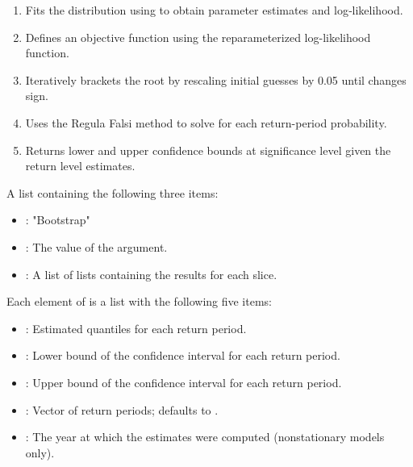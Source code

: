 \documentclass[a4paper]{book}
\begin{document}
%
\begin{Details}
\begin{enumerate}

\item{} Fits the distribution using  to obtain parameter
estimates and log‐likelihood.
\item{} Defines an objective function  using the reparameterized
log-likelihood function.
\item{} Iteratively brackets the root by rescaling initial guesses by 0.05 until
 changes sign.
\item{} Uses the Regula Falsi method to solve  for each
return-period probability.
\item{} Returns lower and upper confidence bounds at significance level 
given the return level estimates.

\end{enumerate}

\end{Details}
%
\begin{Value}
A list containing the following three items:
\begin{itemize}

\item{} : "Bootstrap"
\item{} : The value of the  argument.
\item{} : A list of lists containing the results for each slice.

\end{itemize}


Each element of  is a list with the following five items:
\begin{itemize}

\item{} : Estimated quantiles for each return period.
\item{} : Lower bound of the confidence interval for each return period.
\item{} : Upper bound of the confidence interval for each return period.
\item{} : Vector of return periods; defaults to .
\item{} : The year at which the estimates were computed (nonstationary models only).

\end{itemize}

\end{Value}
\end{document}
